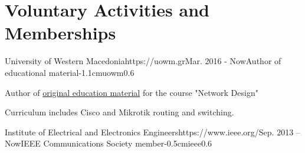 \documentclass{mycv}
\begin{document}
	\section{Voluntary Activities and Memberships}
	\vspace*{0.125cm}	
	\begin{EntryDatedLogo}{University of Western Macedonia}{https://uowm.gr}{Mar. 2016 - Now}{Author of educational material}{-1.1cm}{uowm}{0.6}
		\begin{Itemize}
			\item Author of \href{https://github.com/cdalamagkas/network-design-labs}{original education material} for the course "Network Design"
			\item Curriculum includes Cisco and Mikrotik routing and switching.
		\end{Itemize}
	\end{EntryDatedLogo}

	\vspace*{0.5cm}

	\begin{EntryDatedLogo}{Institute of Electrical and Electronics Engineers}{https://www.ieee.org/}{Sep. 2013 -- Now}{IEEE Communications Society member}{-0.5cm}{ieee}{0.6}
	\end{EntryDatedLogo}
\end{document}
